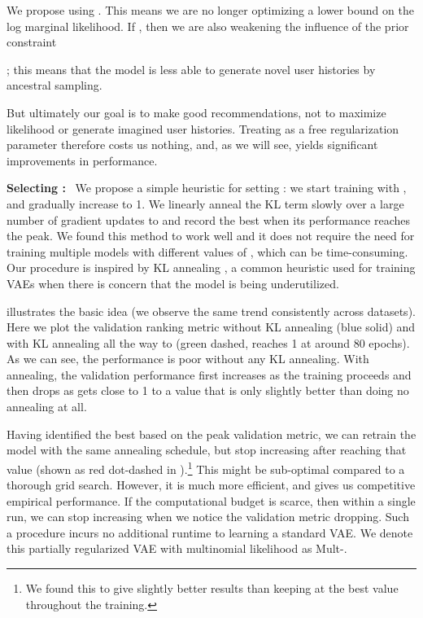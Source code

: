 \documentclass[sigconf]{acmart}
\DeclareRobustCommand{\parhead}[1]{\textbf{#1}~}
\newcommand{\mvae}{{\small Mult-}}
\begin{document}
We propose using . This means we are no longer optimizing a lower bound on the log marginal likelihood.
If , then we are also weakening the influence of the prior constraint

\citep{hoffman2016elbo}; this means that the model is less able to generate novel user histories by ancestral sampling.

But ultimately our goal is to make good recommendations, not to maximize likelihood or generate imagined user histories.
Treating  as a free regularization parameter therefore costs us nothing, and, as we will see, yields significant improvements in performance.

\parhead{Selecting :} 
We propose a simple heuristic for setting : we start
training with , and gradually increase  to 1. 
We linearly anneal the KL term slowly over a large number of gradient updates to  and record the best  when its performance reaches the peak.
We found this method to work well and it does not require the need for training multiple models with different values of , which can be time-consuming. 
Our procedure is inspired by KL annealing \citep{bowman2015generating}, a common heuristic used for training \glspl{VAE} when there is concern that the model is being underutilized. 

 illustrates the basic idea (we observe the same trend consistently across datasets). 
Here we plot the validation ranking metric without KL annealing (blue solid) 
and with KL annealing all the way to  (green dashed,  reaches 1 at around 80 epochs). 
As we can see, the performance is poor without any KL annealing. 
With annealing, the validation performance first increases as the training proceeds and then drops as  gets close to 1 to a value that is only slightly better
than doing no annealing at all. 

Having identified the best  based on the peak validation metric, we can 
retrain the model with the same annealing schedule, but stop increasing  after reaching 
that value (shown as red dot-dashed in ).\footnote{We found this to give slightly better results 
than keeping  at the best value throughout the training.} This might be sub-optimal 
compared to a thorough grid search. However, it is much more efficient, and gives us competitive empirical performance. If the computational budget 
is scarce, then within a single run, we can stop increasing  when we notice the validation metric dropping.
Such a procedure incurs no additional runtime to learning a standard \gls{VAE}.
We denote this partially regularized \gls{VAE} with multinomial likelihood as \mvae.
\end{document}
